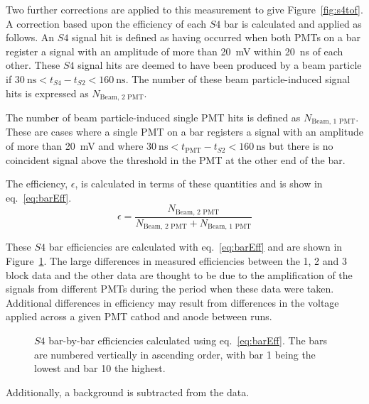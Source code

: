 Two further corrections are applied to this measurement to give Figure~\ref{fig:s4tof}.
A correction based upon the efficiency of each $\mathit{S4}$ bar is calculated and applied as follows.
An $\mathit{S4}$ signal hit is defined as having occurred when both PMTs on a bar register a signal with an amplitude of more than 20~mV within 20~ns of each other.
These $\mathit{S4}$ signal hits are deemed to have been produced by a beam particle if $30~\text{ns} < t_{\mathit{S4}} - t_{\mathit{S2}} < 160~\text{ns}$.
The number of these beam particle-induced signal hits is expressed as $N_{\text{Beam, 2 PMT}}$.

The number of beam particle-induced single PMT hits is defined as $N_{\text{Beam, 1 PMT}}$.
These are cases where a single PMT on a bar registers a signal with an amplitude of more than 20~mV and where $30~\text{ns} < t_{\text{PMT}} - t_{\mathit{S2}} < 160~\text{ns}$ but there is no coincident signal above the threshold in the PMT at the other end of the bar.

The efficiency, $\epsilon$, is calculated in terms of these quantities and is show in eq.~\ref{eq:barEff}.
\begin{equation}
  \epsilon = \frac{N_{\text{Beam, 2 PMT}}}{N_{\text{Beam, 2 PMT}}+N_{\text{Beam, 1 PMT}}}
  \label{eq:barEff}
\end{equation}

These $\mathit{S4}$ bar efficiencies are calculated with eq.~\ref{eq:barEff} and are shown in Figure~\ref{fig:s4Eff}.
The large differences in measured efficiencies between the 1, 2 and 3 block data and the other data are thought to be due to the amplification of the signals from different PMTs during the period when these data were taken.
Additional differences in efficiency may result from differences in the voltage applied across a given PMT cathod and anode between runs.

\begin{figure}[h]
  \centering
  \begin{adjustbox}{max totalsize={.8\textwidth}{.5\textheight},center}
    
  \end{adjustbox}
  \caption{$\mathit{S4}$ bar-by-bar efficiencies calculated using eq.~\ref{eq:barEff}. The bars are numbered vertically in ascending order, with bar 1 being the lowest and bar 10 the highest.}
  \label{fig:s4Eff}
\end{figure}

Additionally, a background is subtracted from the data. %

